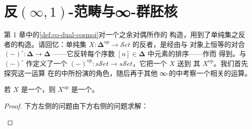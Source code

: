 
\providecommand{\Fun}{\operatorname{Fun}}
\providecommand{\QCat}{\mathcal{Q}\mathcal{C}at}
\providecommand{\sSet}{s\mathcal{S}et}
\providecommand{\Kan}{\mathcal{K}an}
\providecommand{\coreS}{\mathrm{core}_{\ast}}   %
\providecommand{\Disc}{\mathcal{D}\mathrm{isc}} %

\section{反\texorpdfstring{$(\infty,1)$}{(∞,1)}-范畴与∞-群胚核}%
\label{sec:opposite-infinity-1-categories-and-infinity-groupoid-cores}

第 1 章中的\cref{def:co-dual-cosmoi}对一个\trInfinityCosmos{}之余对偶所作的
构造，用到了单纯集之反者的构造。请回忆：单纯集
$X\colon\boldsymbol{\Delta}^{\mathrm{op}}\to\mathcal{S}et$ 的反者，是经由与
对象上恒等的对合 $(-)^{\circ}\colon\boldsymbol{\Delta}\to\boldsymbol{\Delta}$
——它反转每个序数 $[n]\in\boldsymbol{\Delta}$ 中元素的排序——作\trPreComposition{}而
得到。与 $(-)^{\circ}$ 作\trPreComposition{}定义了一个\trFunctor{}
$(-)^{\mathrm{op}}\colon\sSet\to\sSet$，它把一个\trSimplicialSet{} $X$ 送到
其\textbf{\trOppositeSimplicialSet} $X^{\mathrm{op}}$。我们首先探究这一运算
在\trQuasiCategory{}的\trInfinityCosmos{}中所扮演的角色，随后再于其他
∞-\trCategory{}的\trInfinityCosmos{}中考察一个相关的运算。

\begin{lemma}\label{lem:opposite-quasi-category}
若 $X$ 是一个\trQuasiCategory，则 $X^{\mathrm{op}}$ 是一个\trQuasiCategory。
\end{lemma}

\begin{proof}
下方左侧的\trLifting{}问题由下方右侧的\trLifting{}问题求解：
\begin{center}
\end{center}
\end{proof}

